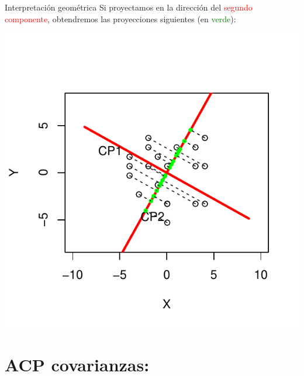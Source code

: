 \documentclass[
  ignorenonframetext,
]{beamer}
\newcommand\red[1]{\textcolor{red}{#1}}
\newcommand\green[1]{\textcolor{green}{#1}}
\begin{document}
\begin{frame}{Interpretación geométrica}
\label{interpretaciuxf3n-geomuxe9trica-3}
Si proyectamos en la dirección del \red{segundo componente}, obtendremos
las proyecciones siguientes (en \green{verde}):

\begin{center}\includegraphics{AnalisisComponentesPrincipales_fusion_files/figure-beamer/inter4.1-1} \end{center}
\end{frame}

\section{ACP covarianzas:}\label{acp-covarianzas}
\end{document}
